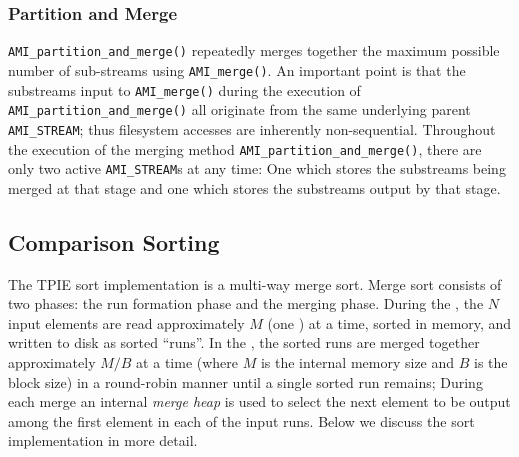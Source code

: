 \subsubsection{Partition and Merge}

\tobeextended

\lstinline|AMI_partition_and_merge()| repeatedly merges together the
maximum possible number of sub-streams using \lstinline|AMI_merge()|.
An important point is that the substreams input to
\lstinline|AMI_merge()| during the execution of
\lstinline|AMI_partition_and_merge()| all originate from the same
underlying parent \lstinline|AMI_STREAM|; thus filesystem accesses are
inherently non-sequential. Throughout the execution of the merging
method \lstinline|AMI_partition_and_merge()|, there are only two
active \lstinline|AMI_STREAM|s at any time: One which stores the
substreams being merged at that stage and one which stores the
substreams output by that stage.


\subsection{Comparison Sorting}

The TPIE sort implementation is a multi-way merge sort.
Merge sort consists of two phases: the run formation phase and the
merging phase. During the , the $N$ input
elements are read approximately $M$ (one ) at a
time, sorted in memory, and written to disk as sorted ``runs''. In the
, the sorted runs are merged together approximately
$M/B$ at a time (where $M$ is the internal memory size and $B$ is the
block size) in a round-robin manner until a single sorted run remains;
During each merge an internal \emph{merge heap} is used to select the
next element to be output among the first element in each of the input
runs. Below we discuss the sort implementation in more detail.

